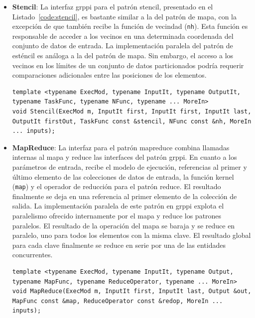 \begin{itemize}
    \item \textbf{Stencil}: La interfaz \acrshort{grppi} para el patrón stencil, presentado en el Listado~\ref{code:stencil}, es bastante similar a la del patrón de mapa, con la excepción de que también recibe la función de vecindad  (\texttt{nh}). Esta función es responsable de acceder a los vecinos en una determinada coordenada del conjunto de datos de entrada. La implementación paralela del patrón de esténcil es análoga a la del patrón de mapa. Sin embargo, el acceso a los vecinos en los límites de un conjunto de datos particionados podría requerir comparaciones adicionales entre las posiciones de los elementos.
    
    \vspace{0.35cm}
    \begin{lstlisting}[frame=single,label={code:stencil},caption={Interfaz Stencil.}]
template <typename ExecMod, typename InputIt, typename OutputIt, typename TaskFunc, typename NFunc, typename ... MoreIn>
void Stencil(ExecMod m, InputIt first, InputIt first, InputIt last, OutputIt firstOut, TaskFunc const &stencil, NFunc const &nh, MoreIn ... inputs);
\end{lstlisting}
\vspace{0.35cm}
    
    \item \textbf{MapReduce}: La interfaz para el patrón mapreduce combina llamadas internas al mapa y reduce las interfaces del patrón \acrshort{grppi}. En cuanto a los parámetros de entrada, recibe el modelo de ejecución, referencias al primer y último elemento de las colecciones de datos de entrada, la función kernel  (\texttt{map}) y el operador de reducción para el patrón reduce. El resultado finalmente se deja en una referencia al primer elemento de la colección de salida. La implementación paralela de este patrón en \acrshort{grppi} explota el paralelismo ofrecido internamente por el mapa y reduce los patrones paralelos. El resultado de la operación del mapa se baraja y se reduce en paralelo, uno para todos los elementos con la misma clave. El resultado global para cada clave finalmente se reduce en serie por una de las entidades concurrentes.
    
    \vspace{0.35cm}
    \begin{lstlisting}[frame=single,label={code:mapreduce},caption={Interfaz MapReduce.}]
template <typename ExecMod, typename InputIt, typename Output, typename MapFunc, typename ReduceOperator, typename ... MoreIn>
void MapReduce(ExecMod m, InputIt first, InputIt last, Output &out, MapFunc const &map, ReduceOperator const &redop, MoreIn ... inputs);
\end{lstlisting}
\vspace{0.35cm}
    

\end{itemize}
